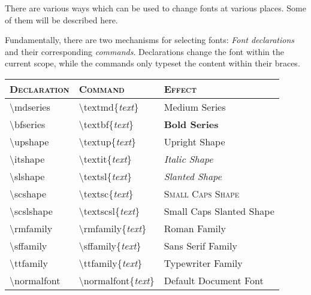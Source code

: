 \documentclass[a4paper,oneside,11pt]{article}
\begin{document}
There  are  various  ways  which  can  be used  to  change  fonts  at  various
places. Some of them will be described here.

Fundamentally,  there  are  two  mechanisms for  selecting  fonts:  \emph{Font
declarations} and their corresponding \emph{commands}. Declarations change the
font within the current  scope, while  the commands  only typeset  the content
within their braces.

\begin{center}
    \begin{tabular}{>{\ttfamily}l<{\normalfont} >{\ttfamily}l<{\normalfont} l}
        \toprule
        \normalfont\scshape Declaration & \normalfont\scshape Command  & \scshape Effect \\
        \midrule
        \textbackslash{}mdseries   & \textbackslash{}textmd\{\textit{text}\}     & \mdseries Medium Series             \\
        \textbackslash{}bfseries   & \textbackslash{}textbf\{\textit{text}\}     & \bfseries Bold Series               \\
        \textbackslash{}upshape    & \textbackslash{}textup\{\textit{text}\}     & \upshape Upright Shape              \\
        \textbackslash{}itshape    & \textbackslash{}textit\{\textit{text}\}     & \itshape Italic Shape               \\
        \textbackslash{}slshape    & \textbackslash{}textsl\{\textit{text}\}     & \slshape Slanted Shape              \\
        \textbackslash{}scshape    & \textbackslash{}textsc\{\textit{text}\}     & \scshape Small Caps Shape           \\
        \textbackslash{}scslshape  & \textbackslash{}textscsl\{\textit{text}\}   & \scslshape Small Caps Slanted Shape \\
        \textbackslash{}rmfamily   & \textbackslash{}rmfamily\{\textit{text}\}   & \rmfamily Roman Family              \\
        \textbackslash{}sffamily   & \textbackslash{}sffamily\{\textit{text}\}   & \sffamily Sans Serif Family         \\
        \textbackslash{}ttfamily   & \textbackslash{}ttfamily\{\textit{text}\}   & \ttfamily Typewriter Family         \\
        \textbackslash{}normalfont & \textbackslash{}normalfont\{\textit{text}\} & \normalfont Default Document Font   \\
        \bottomrule
    \end{tabular}
\end{center}
\end{document}
